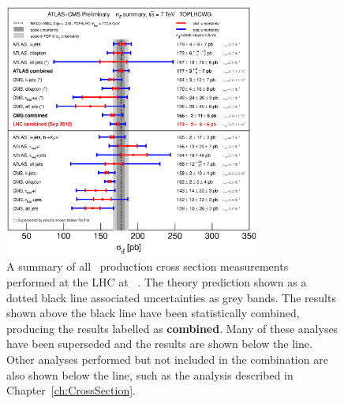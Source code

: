 \begin{figure}[htbp]
  \centering
  \includegraphics[width=0.75\textwidth]{PartTopQuark/Plots/tt_xsec_7TeV.eps}
  \caption[A summary of all \ttbar\ production cross section measurements performed at the LHC at \cmsS.]{A summary of all \ttbar\ production cross section measurements performed at the LHC at \cmsS~\cite{TopQuark:SummaryPlots}. The theory prediction shown as a dotted black line associated uncertainties as grey bands. The results shown above the black line have been statistically combined, producing the results labelled as \textbf{combined}. Many of these analyses have been superseded and the results are shown below the line. Other analyses performed but not included in the combination are also shown below the line, such as the analysis described in Chapter~\ref{ch:CrossSection}.}\label{fig:TopQuarkPairProductionSummaryLHC}
\end{figure}

